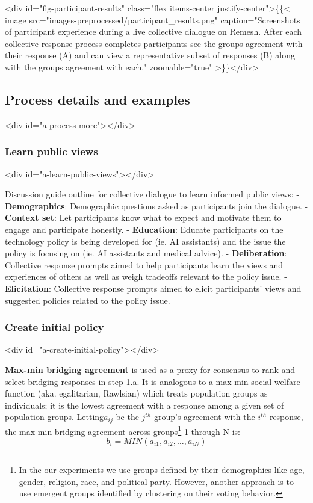 \documentclass{article}
\begin{document}
<div id="fig-participant-results" class="flex items-center justify-center">\{\{< image src="images-preprocessed/participant_results.png" caption="Screenshots of participant experience during a live collective dialogue on Remesh. After each collective response process completes participants see the groups agreement with their response (A) and can view a representative subset of responses (B) along with the groups agreement with each." zoomable="true" >\}\}</div>




\subsection{Process details and examples}<div id="a-process-more"></div>


\subsubsection{Learn public views}<div id="a-learn-public-views"></div>


Discussion guide outline for collective dialogue to learn informed public views:
-  \textbf{Demographics}: Demographic questions asked as participants join the dialogue.
-  \textbf{Context set}: Let participants know what to expect and motivate them to engage and participate honestly.
-  \textbf{Education}: Educate participants on the technology policy is being developed for (ie. AI assistants) and the issue the policy is focusing on (ie. AI assistants and medical advice).
-  \textbf{Deliberation}: Collective response prompts aimed to help participants learn the views and experiences of others as well as weigh tradeoffs relevant to the policy issue.
-  \textbf{Elicitation}: Collective response prompts aimed to elicit participants' views and suggested policies related to the policy issue.

\subsubsection{Create initial policy}<div id="a-create-initial-policy"></div>


\textbf{Max-min bridging agreement} is used as a proxy for consensus to rank and select bridging responses in step 1.a. It is analogous to a max-min social welfare function (aka. egalitarian, Rawlsian) \cite{theory1971rawls} which treats population groups as individuals; it is the lowest agreement with a response among a given set of population groups. Letting$a_{ij}$ be the $j^{th}$ group’s agreement with the $i^{th}$ response, the max-min bridging agreement across groups\footnote{In the our experiments we use groups defined by their demographics like age, gender, religion, race, and political party. However, another approach is to use emergent groups identified by clustering on their voting behavior\cite{small2021polis}.} 1 through N is: 
\begin{equation}
 b_i = MIN(a_{i1}, a_{i2}, … , a_{iN})
\end{equation}
\end{document}
